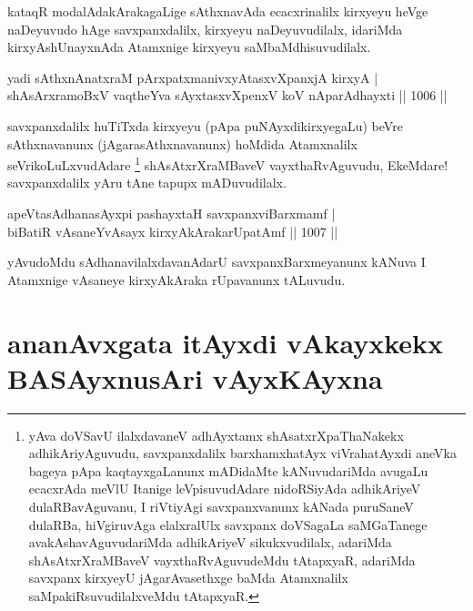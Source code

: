 \begin{artha}
kataqR modalAdakArakagaLige sAthxnavAda ecacxrinalilx kirxyeyu heVge naDeyuvudo hAge savxpanxdalilx, kirxyeyu naDeyuvudilalx, idariMda kirxyAshUnayxnAda Atamxnige kirxyeyu saMbaMdhisuvudilalx.
\end{artha}

\begin{shl}
yadi sAthxnAnatxraM pArxpatxmanivxyAtasxvXpanxjA kirxyA | \\
shAsArxramoBxV vaqtheYva sAyxtasxvXpenxV koV nAparAdhayxti \hfill||  1006 ||  
\end{shl}

\begin{artha}
savxpanxdalilx huTiTxda kirxyeyu (pApa puNAyxdikirxyegaLu) beVre sAthxnavanunx (jAgarasAthxnavanunx) hoMdida Atamxnalilx seVrikoLuLxvudAdare \footnote{yAva doVSavU ilalxdavaneV adhAyxtamx shAsatxrXpaThaNakekx adhikAriyAguvudu, savxpanxdalilx barxhamxhatAyx viVrahatAyxdi aneVka bageya pApa kaqtayxgaLanunx mADidaMte kANuvudariMda avugaLu ecacxrAda meVlU Itanige leVpisuvudAdare nidoRSiyAda adhikAriyeV dulaRBavAguvanu, I riVtiyAgi savxpanxvanunx kANada puruSaneV dulaRBa, hiVgiruvAga elalxralUlx savxpanx doVSagaLa saMGaTanege avakAshavAguvudariMda adhikAriyeV sikukxvudilalx, adariMda shAsAtxrXraMBaveV vayxthaRvAguvudeMdu tAtapxyaR, adariMda savxpanx kirxyeyU jAgarAvasethxge baMda Atamxnalilx saMpakiRsuvudilalxveMdu tAtapxyaR.} shAsAtxrXraMBaveV vayxthaRvAguvudu, EkeMdare! savxpanxdalilx yAru tAne tapupx mADuvudilalx.
\end{artha}


\begin{shl}
apeVtasAdhanasAyxpi pashayxtaH savxpanxviBarxmamf | \\
biBatiR vAsaneYvAsayx kirxyAkArakarUpatAmf \hfill||  1007 ||  
\end{shl}

\begin{artha}
yAvudoMdu sAdhanavilalxdavanAdarU savxpanxBarxmeyanunx kANuva I Atamxnige vAsaneye kirxyAkAraka rUpavanunx tALuvudu.
\end{artha}

\section*{ananAvxgata itAyxdi vAkayxkekx BASAyxnusAri vAyxKAyxna}

